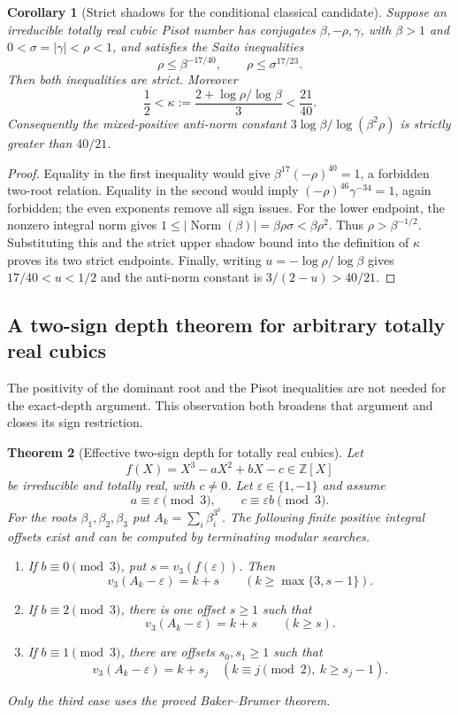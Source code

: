 \documentclass[11pt,a4paper]{article}
\newtheorem{theorem}{Theorem}[section]
\newtheorem{corollary}[theorem]{Corollary}\newtheorem{mainthm}[theorem]{Theorem}
\theoremstyle{definition}\newtheorem{definition}[theorem]{Definition}
\theoremstyle{remark}\newtheorem{remark}[theorem]{Remark}
\begin{document}
\begin{corollary}[Strict shadows for the conditional classical candidate]
\label{R17:cor:new-strict-shadow}
Suppose an irreducible totally real cubic Pisot number has conjugates
$\beta,-\rho,\gamma$, with $\beta>1$ and
$0<\sigma=|\gamma|<\rho<1$, and satisfies the Saito inequalities
\[
 \rho\le\beta^{-17/40},\qquad \rho\le\sigma^{17/23}.
\]
Then both inequalities are strict. Moreover
\[
 \frac12<\kappa:=\frac{2+\log\rho/\log\beta}{3}<\frac{21}{40}.
\]
Consequently the mixed-positive anti-norm constant
$3\log\beta/\log(\beta^2\rho)$ is strictly greater than $40/21$.
\end{corollary}
\begin{proof}
Equality in the first inequality would give
$\beta^{17}(-\rho)^{40}=1$, a forbidden two-root relation.
Equality in the second would imply
$(-\rho)^{46}\gamma^{-34}=1$, again forbidden; the even exponents
remove all sign issues. For the lower endpoint, the nonzero integral
norm gives
$1\le|\operatorname{Norm}(\beta)|=\beta\rho\sigma<\beta\rho^2$.
Thus $\rho>\beta^{-1/2}$. Substituting this and the strict upper shadow
bound into the definition of $\kappa$ proves its two strict endpoints.
Finally, writing $u=-\log\rho/\log\beta$ gives
$17/40<u<1/2$ and the anti-norm constant is $3/(2-u)>40/21$.
\end{proof}

\subsection{A two-sign depth theorem for arbitrary totally real cubics}
\label{R17:sec:new-two-sign-depth}

The positivity of the dominant root and the Pisot inequalities are not
needed for the exact-depth argument. This observation both broadens that
argument and closes its sign restriction.

\begin{theorem}[Effective two-sign depth for totally real cubics]
\label{R17:thm:new-two-sign-depth}\label{R17:thm:depth}
Let
\[
 f(X)=X^3-aX^2+bX-c\in\mathbb Z[X]
\]
be irreducible and totally real, with $c\ne0$. Let
$\varepsilon\in\{1,-1\}$ and assume
\[
 a\equiv\varepsilon\pmod3,\qquad c\equiv\varepsilon b\pmod3.
\]
For the roots $\beta_1,\beta_2,\beta_3$ put
$A_k=\sum_i\beta_i^{3^k}$. The following finite positive integral
 offsets exist and can be computed by terminating modular searches.
\begin{enumerate}
\item If $b\equiv0\pmod3$, put $s=v_3(f(\varepsilon))$. Then
\[
 v_3(A_k-\varepsilon)=k+s
 \qquad(k\ge\max\{3,s-1\}).
\]
\item If $b\equiv2\pmod3$, there is one offset $s\ge1$ such that
\[
 v_3(A_k-\varepsilon)=k+s\qquad(k\ge s).
\]
\item If $b\equiv1\pmod3$, there are offsets $s_0,s_1\ge1$ such that
\[
 v_3(A_k-\varepsilon)=k+s_j
 \quad(k\equiv j\pmod2,\ k\ge s_j-1).
\]
\end{enumerate}
Only the third case uses the proved Baker--Brumer theorem.
\end{theorem}
\end{document}
